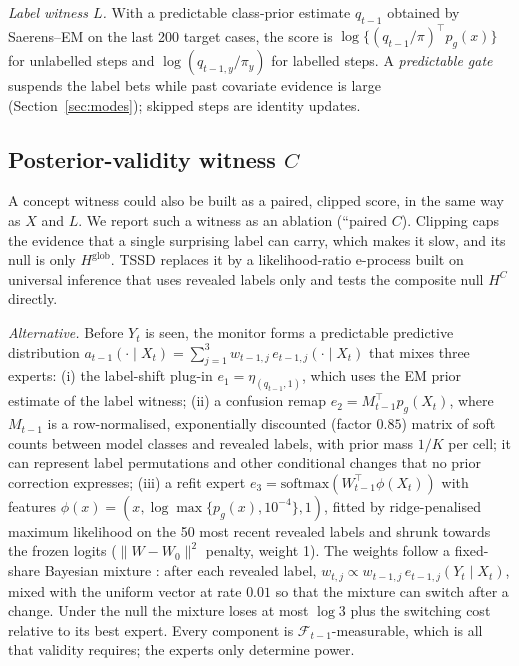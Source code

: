 \emph{Label witness $L$.} With a predictable class-prior estimate $q_{t-1}$ obtained by Saerens--EM \citep{saerens2002} on the last 200 target cases, the score is $\log\{(q_{t-1}/\pi)^\top p_g(x)\}$ for unlabelled steps and $\log(q_{t-1,y}/\pi_y)$ for labelled steps. A \emph{predictable gate} suspends the label bets while past covariate evidence is large (Section~\ref{sec:modes}); skipped steps are identity updates.

\subsection{Posterior-validity witness $C$}
A concept witness could also be built as a paired, clipped score, in the same way as $X$ and $L$. We report such a witness as an ablation (``paired $C$). Clipping caps the evidence that a single surprising label can carry, which makes it slow, and its null is only $H^{\mathrm{glob}}$. TSSD replaces it by a likelihood-ratio e-process built on universal inference \citep{wasserman2020} that uses revealed labels only and tests the composite null $H^C$ directly.

\emph{Alternative.} Before $Y_t$ is seen, the monitor forms a predictable predictive distribution $a_{t-1}(\cdot\mid X_t)=\sum_{j=1}^{3}w_{t-1,j}\,e_{t-1,j}(\cdot\mid X_t)$ that mixes three experts:
(i) the label-shift plug-in $e_1=\eta_{(q_{t-1},1)}$, which uses the EM prior estimate of the label witness;
(ii) a confusion remap $e_2=M_{t-1}^\top p_g(X_t)$, where $M_{t-1}$ is a row-normalised, exponentially discounted (factor $0.85$) matrix of soft counts between model classes and revealed labels, with prior mass $1/K$ per cell; it can represent label permutations and other conditional changes that no prior correction expresses;
(iii) a refit expert $e_3=\mathrm{softmax}(W_{t-1}^\top\phi(X_t))$ with features $\phi(x)=(x,\log\max\{p_g(x),10^{-4}\},1)$, fitted by ridge-penalised maximum likelihood on the 50 most recent revealed labels and shrunk towards the frozen logits ($\|W-W_0\|^2$ penalty, weight 1).
The weights follow a fixed-share Bayesian mixture \citep{herbster1998}: after each revealed label, $w_{t,j}\propto w_{t-1,j}\,e_{t-1,j}(Y_t\mid X_t)$, mixed with the uniform vector at rate $0.01$ so that the mixture can switch after a change. Under the null the mixture loses at most $\log3$ plus the switching cost relative to its best expert. Every component is $\mathcal F_{t-1}$-measurable, which is all that validity requires; the experts only determine power.

